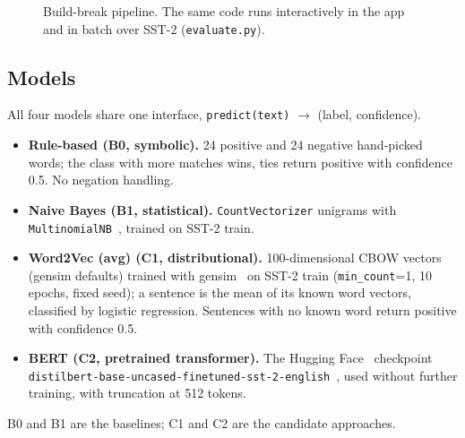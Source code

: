 \documentclass[conference]{IEEEtran}
\begin{document}
\begin{figure}[t]
\centering
{}
\caption{Build-break pipeline. The same code runs interactively in the app and in batch over SST-2 (\texttt{evaluate.py}).}
\label{fig:pipeline}
\end{figure}

\subsection{Models}
All four models share one interface, \texttt{predict(text)} $\rightarrow$ (label, confidence).
\begin{itemize}
  \item \textbf{Rule-based (B0, symbolic).} 24 positive and 24 negative hand-picked words; the class
        with more matches wins, ties return positive with confidence 0.5. No negation handling.
  \item \textbf{Naive Bayes (B1, statistical).} \texttt{CountVectorizer} unigrams with
        \texttt{MultinomialNB}~\cite{pedregosa2011}, trained on SST-2 train.
  \item \textbf{Word2Vec (avg) (C1, distributional).} 100-dimensional CBOW vectors (gensim defaults)
        trained with gensim~\cite{rehurek2010} on SST-2 train (\texttt{min\_count}=1, 10 epochs,
        fixed seed); a sentence is the mean of its known word vectors, classified by logistic
        regression. Sentences with no known word return positive with confidence 0.5.
  \item \textbf{BERT (C2, pretrained transformer).} The Hugging Face~\cite{wolf2020} checkpoint
        \texttt{distilbert-base-uncased-}\allowbreak\texttt{finetuned-sst-2-english}~\cite{sanh2019}, used without
        further training, with truncation at 512 tokens.
\end{itemize}
B0 and B1 are the baselines; C1 and C2 are the candidate approaches.
\end{document}
